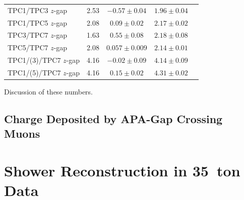 \begin{table}[p]
\begin{tabular}{l  c  c  c  c }
      TPC1/TPC3 $z$-gap & 2.53 & $-0.57 \pm 0.04$ & $1.96 \pm 0.04$ \\
      TPC1/TPC5 $z$-gap & 2.08 & $0.09 \pm 0.02$  & $2.17 \pm 0.02$ \\
      TPC3/TPC7 $z$-gap & 1.63 & $0.55 \pm 0.08$    & $2.18 \pm 0.08$ \\
      TPC5/TPC7 $z$-gap & 2.08 & $0.057 \pm 0.009$  & $2.14 \pm 0.01$ \\
      \midrule
      TPC1/(3)/TPC7 $z$-gap & 4.16 & $-0.02 \pm 0.09$ & $4.14 \pm 0.09$ \\
      TPC1/(5)/TPC7 $z$-gap & 4.16 & $0.15 \pm 0.02$  & $4.31 \pm 0.02$ \\
      \bottomrule
    \end{tabular}
\end{table}

Discussion of these numbers.

\subsection{Charge Deposited by APA-Gap Crossing Muons}\label{sec:APAGapCharge}

\section{Shower Reconstruction in 35~ton Data}\label{sec:ShowerData}

